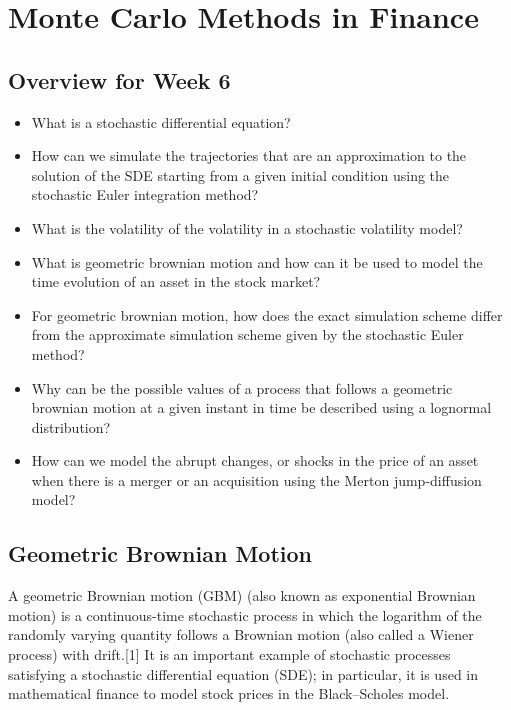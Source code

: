 \documentclass[12pt]{article}
\begin{document}
\section{Monte Carlo Methods in Finance}
\subsection{Overview for Week 6}
\begin{itemize}
\item What is a stochastic differential equation?
\item How can we simulate the trajectories that are an approximation to the solution of the SDE starting from a given initial condition using the stochastic Euler integration method?
\item What is the volatility of the volatility in a stochastic volatility model?
\item What is geometric brownian motion and how can it be used to model the time evolution of an asset in the stock market?
\item For geometric brownian motion, how does the exact simulation scheme differ from the approximate simulation scheme given by the stochastic Euler method?
\item Why can be the possible values of a process that follows a geometric brownian motion at a given instant in time be described using a lognormal distribution?
\item How can we model the abrupt changes, or shocks in the price of an asset when there is a merger or an acquisition using the Merton jump-diffusion model?
\end{itemize}
\subsection{Geometric Brownian Motion}
A geometric Brownian motion (GBM) (also known as exponential Brownian motion) is a continuous-time stochastic process in which the logarithm of the randomly varying quantity follows a Brownian motion (also called a Wiener process) with drift.[1] It is an important example of stochastic processes satisfying a stochastic differential equation (SDE); in particular, it is used in mathematical finance to model stock prices in the Black–Scholes model.
\end{document}
